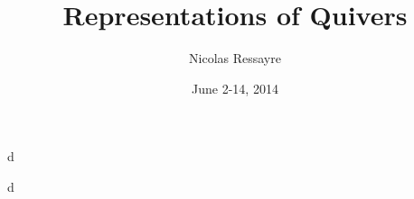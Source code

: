 \documentclass{article}
\title{Representations of Quivers}
\author{Nicolas Ressayre}
\date{June 2-14, 2014}
\begin{document}
\maketitle





d

\begin{theorem}d
\end{theorem}
\end{document}
